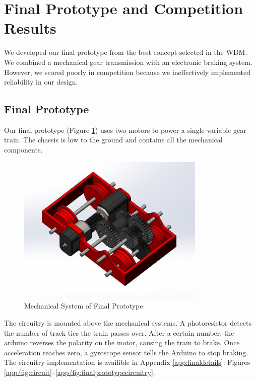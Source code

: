\documentclass[class=../report, crop=false]{standalone}
\begin{document}
\section{Final Prototype and Competition Results}

We developed our final \gls{prototype} from the best concept selected in the WDM.
We combined a mechanical gear transmission with an electronic braking system.
However, we scored poorly in competition because we ineffectively implemented reliability in our design.

\subsection{Final Prototype}

Our final prototype (Figure \ref{fig:finalmech}) uses two motors to power a single variable gear train.
The chassis is low to the ground and contains all the mechanical components.

\begin{figure}[H]
	\centering
	\includegraphics[width=0.8\textwidth]{../res/img/finalmech}
	\caption{Mechanical System of Final Prototype}
	\label{fig:finalmech}
\end{figure}

The circuitry is mounted above the mechanical systems.
A photoresistor detects the number of track ties the train passes over.
After a certain number, the \gls{arduino} reverses the polarity on the motor, causing the train to brake.
Once acceleration reaches zero, a gyroscope sensor tells the Arduino to stop braking.
The circuitry implementation is availible in Appendix \ref{app:finaldetails}:  Figures \ref{app/fig:circuit}--\ref{app/fig:finalprototypecircuitry}.
\end{document}
